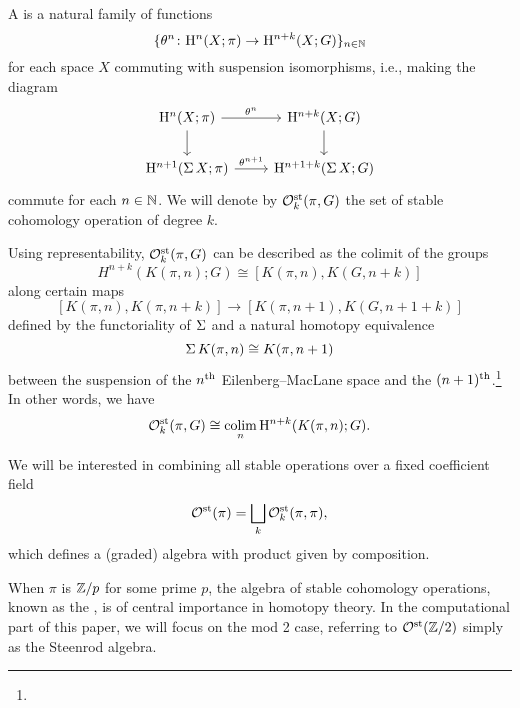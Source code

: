 A  is a natural family of functions
\[
\{\theta^n \colon \mathrm{H}^n(X; \pi) \to \mathrm{H}^{n+k}(X; G)\}_{n \in \mathbb{N}}
\]
for each space $X$ commuting with suspension isomorphisms, i.e., making the diagram
\[
\begin{tikzcd}
	\rH^n(X; \pi) \rar["\theta^n"] \dar & \rH^{n+k}(X; G) \dar \\
	\rH^{n+1}(\sus X; \pi) \rar["\theta^{n+1}"] & \rH^{n+1+k}(\sus X; G)
\end{tikzcd}
\]
commute for each $n \in \mathbb{N}$.
We will denote by $\mathcal{O}^{\mathrm{st}}_k(\pi, G)$ the set of stable cohomology operation of degree $k$.


Using representability, $\mathcal{O}^{\mathrm{st}}_k(\pi, G)$ can be described as the colimit of the groups
\[
H^{n+k}(K(\pi, n); G) \cong [K(\pi, n), K(G, n+k)]
\]
along certain maps
\[
[K(\pi, n), K(\pi, n+k)] \to [K(\pi, n+1), K(G, n+1+k)]
\]
defined by the functoriality of $\operatorname{\Sigma}$ and a natural homotopy equivalence
\begin{equation}\label{eq:suspension of K(pi,n)}
	\operatorname{\Sigma} K(\pi, n) \cong K(\pi, n+1)
\end{equation}
between the suspension of the $n^{\mathrm{th}}$ Eilenberg--MacLane space and the $(n+1)^{\mathrm{th}}$.\footnote{}
In other words, we have
\[
\mathcal{O}^{\mathrm{st}}_k(\pi, G) \cong \operatorname*{colim}_n \mathrm{H}^{n+k}(K(\pi, n); G).
\]

We will be interested in combining all stable operations over a fixed coefficient field
\[
\mathcal{O}^{\mathrm{st}}(\pi) = \bigsqcup_k \mathcal{O}^{\mathrm{st}}_k(\pi, \pi),
\]
which defines a (graded) algebra with product given by composition.

When $\pi$ is $\mathbb{Z}/p$ for some prime $p$, the algebra of stable cohomology operations, known as the , is of central importance in homotopy theory.
In the computational part of this paper, we will focus on the mod 2 case, referring to $\mathcal{O}^{\mathrm{st}}(\mathbb{Z}/2)$ simply as the Steenrod algebra.

